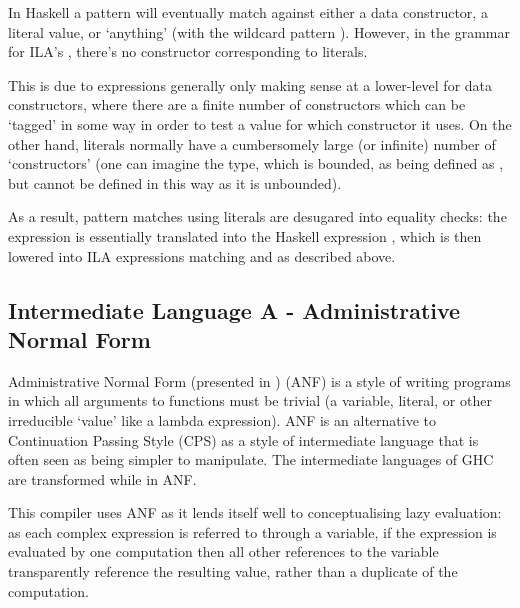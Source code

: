 \documentclass[dissertation.tex]{subfiles}
\begin{document}
{{{            In Haskell a pattern will eventually match against either a data constructor, a literal value, or
            `anything' (with the wildcard pattern \haskell{_}). However, in the grammar for ILA's
            , there's no constructor corresponding to literals.
            
            This is due to  expressions generally only making sense at a lower-level for data
            constructors, where there are a finite number of constructors which can be `tagged' in some way in order
            to test a value for which constructor it uses. On the other hand, literals normally have a cumbersomely
            large (or infinite) number of `constructors' (one can imagine the  type, which is bounded,
            as being defined as , but  cannot be
            defined in this way as it is unbounded).
            
            As a result, pattern matches using literals are desugared into equality checks: the expression
             is essentially translated into the Haskell expression
            , which is then lowered into ILA 
            expressions matching  and  as described above.

        }
    }
    \subsection{Intermediate Language A - Administrative Normal Form}
    {

        Administrative Normal Form (presented in \cite{ANF}) (ANF) is a style of writing programs in which all arguments
        to functions must be trivial (a variable, literal, or other irreducible `value' like a lambda expression). ANF
        is an alternative to Continuation Passing Style (CPS) as a style of intermediate language that is often seen as
        being simpler to manipulate. The intermediate languages of GHC are transformed while in ANF.

        This compiler uses ANF as it lends itself well to conceptualising lazy evaluation: as each complex
        expression is referred to through a variable, if the expression is evaluated by one computation then all
        other references to the variable transparently reference the resulting value, rather than a duplicate of the
        computation.

}}
\end{document}
